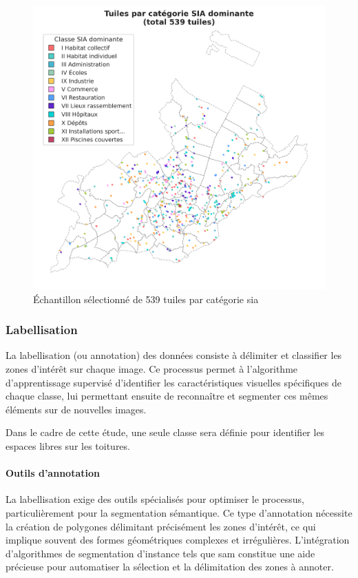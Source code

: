 \begin{figure}[H]
    \centering
    \includegraphics[width=1\linewidth]{02-main/figures/ch3/ch3_selection_donnees_04_selection_map_sia.png}
    \caption{Échantillon sélectionné de 539 tuiles par catégorie \gls{sia}}
    \label{fig:ch3_selection_donnees_04_selection_map_sia}
\end{figure}

\subsubsection{Labellisation}
La labellisation (ou annotation) des données consiste à délimiter et classifier les zones d'intérêt sur chaque image. Ce processus permet à l'algorithme d'apprentissage supervisé d'identifier les caractéristiques visuelles spécifiques de chaque classe, lui permettant ensuite de reconnaître et segmenter ces mêmes éléments sur de nouvelles images.

Dans le cadre de cette étude, une seule classe sera définie pour identifier les espaces libres sur les toitures.

\paragraph{Outils d'annotation}
La labellisation exige des outils spécialisés pour optimiser le processus, particulièrement pour la segmentation sémantique. Ce type d'annotation nécessite la création de polygones délimitant précisément les zones d'intérêt, ce qui implique souvent des formes géométriques complexes et irrégulières. L'intégration d'algorithmes de segmentation d'instance tels que \acrshort{sam} constitue une aide précieuse pour automatiser la sélection et la délimitation des zones à annoter.

